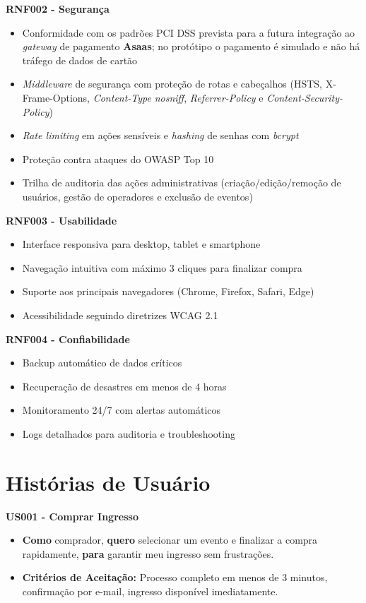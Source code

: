 \textbf{RNF002 - Segurança}
\begin{itemize}
    \item Conformidade com os padrões PCI DSS prevista para a futura integração ao \textit{gateway} de pagamento \textbf{Asaas}; no protótipo o pagamento é simulado e não há tráfego de dados de cartão~\cite{PCIDSS:2022}
    \item \textit{Middleware} de segurança com proteção de rotas e cabeçalhos (HSTS, X-Frame-Options, \textit{Content-Type} \textit{nosniff}, \textit{Referrer-Policy} e \textit{Content-Security-Policy})
    \item \textit{Rate limiting} em ações sensíveis e \textit{hashing} de senhas com \textit{bcrypt}
    \item Proteção contra ataques do OWASP Top 10~\cite{OWASP:2021}
    \item Trilha de auditoria das ações administrativas (criação/edição/remoção de usuários, gestão de operadores e exclusão de eventos)
\end{itemize}

\textbf{RNF003 - Usabilidade}
\begin{itemize}
    \item Interface responsiva para desktop, tablet e smartphone
    \item Navegação intuitiva com máximo 3 cliques para finalizar compra
    \item Suporte aos principais navegadores (Chrome, Firefox, Safari, Edge)
    \item Acessibilidade seguindo diretrizes WCAG 2.1~\cite{WCAG:2018}
\end{itemize}

\textbf{RNF004 - Confiabilidade}
\begin{itemize}
    \item Backup automático de dados críticos
    \item Recuperação de desastres em menos de 4 horas
    \item Monitoramento 24/7 com alertas automáticos
    \item Logs detalhados para auditoria e troubleshooting
\end{itemize}

\section{Histórias de Usuário}

\textbf{US001 - Comprar Ingresso}
\begin{itemize}
    \item \textbf{Como} comprador, \textbf{quero} selecionar um evento e finalizar a compra rapidamente, \textbf{para} garantir meu ingresso sem frustrações.
    \item \textbf{Critérios de Aceitação:} Processo completo em menos de 3 minutos, confirmação por e-mail, ingresso disponível imediatamente.
\end{itemize}

